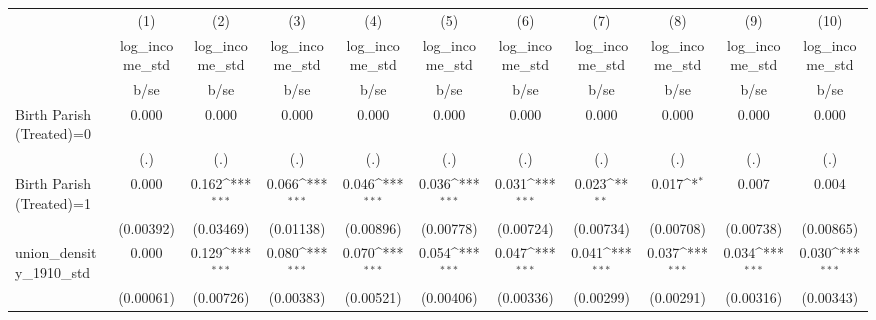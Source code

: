 {
\def\sym#1{\ifmmode^{#1}\else\(^{#1}\)\fi}
\begin{tabular}{l*{10}{c}}
\hline\hline
                    &\multicolumn{1}{c}{(1)}&\multicolumn{1}{c}{(2)}&\multicolumn{1}{c}{(3)}&\multicolumn{1}{c}{(4)}&\multicolumn{1}{c}{(5)}&\multicolumn{1}{c}{(6)}&\multicolumn{1}{c}{(7)}&\multicolumn{1}{c}{(8)}&\multicolumn{1}{c}{(9)}&\multicolumn{1}{c}{(10)}\\
                    &\multicolumn{1}{c}{log\_income\_std}&\multicolumn{1}{c}{log\_income\_std}&\multicolumn{1}{c}{log\_income\_std}&\multicolumn{1}{c}{log\_income\_std}&\multicolumn{1}{c}{log\_income\_std}&\multicolumn{1}{c}{log\_income\_std}&\multicolumn{1}{c}{log\_income\_std}&\multicolumn{1}{c}{log\_income\_std}&\multicolumn{1}{c}{log\_income\_std}&\multicolumn{1}{c}{log\_income\_std}\\
                    &        b/se         &        b/se         &        b/se         &        b/se         &        b/se         &        b/se         &        b/se         &        b/se         &        b/se         &        b/se         \\
\hline
Birth Parish (Treated)=0&       0.000         &       0.000         &       0.000         &       0.000         &       0.000         &       0.000         &       0.000         &       0.000         &       0.000         &       0.000         \\
                    &         (.)         &         (.)         &         (.)         &         (.)         &         (.)         &         (.)         &         (.)         &         (.)         &         (.)         &         (.)         \\
Birth Parish (Treated)=1&       0.000         &       0.162\sym{***}&       0.066\sym{***}&       0.046\sym{***}&       0.036\sym{***}&       0.031\sym{***}&       0.023\sym{**} &       0.017\sym{*}  &       0.007         &       0.004         \\
                    &   (0.00392)         &   (0.03469)         &   (0.01138)         &   (0.00896)         &   (0.00778)         &   (0.00724)         &   (0.00734)         &   (0.00708)         &   (0.00738)         &   (0.00865)         \\
union\_density\_1910\_std&       0.000         &       0.129\sym{***}&       0.080\sym{***}&       0.070\sym{***}&       0.054\sym{***}&       0.047\sym{***}&       0.041\sym{***}&       0.037\sym{***}&       0.034\sym{***}&       0.030\sym{***}\\
                    &   (0.00061)         &   (0.00726)         &   (0.00383)         &   (0.00521)         &   (0.00406)         &   (0.00336)         &   (0.00299)         &   (0.00291)         &   (0.00316)         &   (0.00343)         \\

\end{tabular}}

